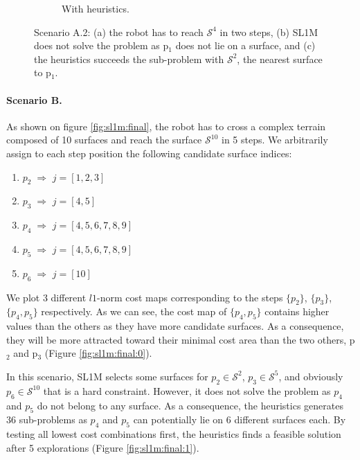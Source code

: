 \begin{figure}[t]
\begin{subfigure}[t]{0.48\linewidth}
    \caption{With heuristics.}
    \label{fig:sl1m:a12:1}
    \end{subfigure}
    \caption{Scenario A.2: (a) the robot has to reach $\mathcal{S}^4$ in two steps, (b) SL1M does not solve the problem as p$_1$ does not lie on a surface, and (c) the heuristics succeeds the sub-problem with $\mathcal{S}^2$, the nearest surface to p$_1$.}
    \label{fig:sl1m:a12}
\end{figure}



\paragraph{Scenario B.}
As shown on figure \ref{fig:sl1m:final}, the robot has to cross a complex terrain composed of 10 surfaces and reach the surface $\mathcal{S}^{10}$ in 5 steps. 
We arbitrarily assign to each step position the following candidate surface indices:
\begin{enumerate}
    \item $p_2 \; \Rightarrow$ \; $j = [1,2,3]$
    \item $p_3 \; \Rightarrow$ \; $j = [4,5]$
    \item $p_4 \; \Rightarrow$ \; $j = [4,5,6,7,8,9]$
    \item $p_5 \; \Rightarrow$ \; $j = [4,5,6,7,8,9]$
    \item $p_6 \; \Rightarrow$ \; $j = [10]$
\end{enumerate}
We plot 3 different $l1$-norm cost maps corresponding to the steps $\{p_2\}$, $\{p_3\}$, $\{p_4,p_5\}$ respectively.
As we can see, the cost map of $\{p_4,p_5\}$ contains higher values than the others as they have more candidate surfaces. 
As a consequence, they will be more attracted toward their minimal cost area than the two others, p$_2$ and p$_3$ (Figure \ref{fig:sl1m:final:0}).

In this scenario, SL1M selects some surfaces for $p_2 \in \mathcal{S}^2$, $p_3 \in \mathcal{S}^5$, and obviously $p_6 \in \mathcal{S}^{10}$ that is a hard constraint. 
However, it does not solve the problem as $p_4$ and $p_5$ do not belong to any surface.
As a consequence, the heuristics generates 36 sub-problems as $p_4$ and $p_5$ can potentially lie on 6 different surfaces each. 
By testing all lowest cost combinations first, the heuristics finds a feasible solution after 5 explorations (Figure \ref{fig:sl1m:final:1}).

